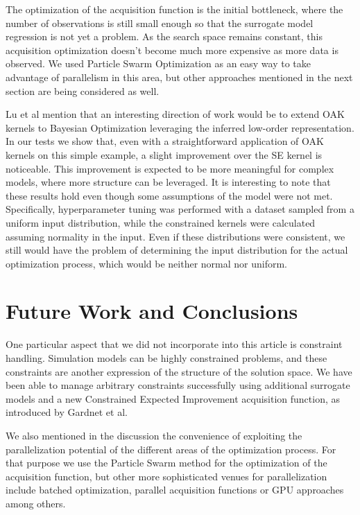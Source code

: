 \documentclass{IOS-Book-Article}
\begin{document}
	The optimization of the acquisition function is the initial bottleneck, where the number of observations is still small enough so that the surrogate model regression is not yet a problem. As the search space remains constant, this acquisition optimization doesn't become much more expensive as more data is observed. We used Particle Swarm Optimization as an easy way to take advantage of parallelism in this area, but other approaches mentioned in the next section are being considered as well\cite{acquisition-functions}.
	
	Lu et al\cite{gp-additive-orthogonal} mention that an interesting direction of work would be to extend OAK kernels to Bayesian Optimization leveraging the inferred low-order representation. In our tests we show that, even with a straightforward application of OAK kernels on this simple example, a slight improvement over the SE kernel is noticeable. This improvement is expected to be more meaningful for complex models, where more structure can be leveraged. It is interesting to note that these results hold even though some assumptions of the model were not met. Specifically, hyperparameter tuning was performed with a dataset sampled from a uniform input distribution, while the constrained kernels were calculated assuming normality in the input. Even if these distributions were consistent, we still would have the problem of determining the input distribution for the actual optimization process, which would be neither normal nor uniform.
	
	
	\section{Future Work and Conclusions}
	One particular aspect that we did not incorporate into this article is constraint handling. Simulation models can be highly constrained problems, and these constraints are another expression of the structure of the solution space. We have been able to manage arbitrary constraints successfully using additional surrogate models and a new Constrained Expected Improvement acquisition function, as introduced by Gardnet et al\cite{gp-constraints}.
	
	We also mentioned in the discussion the convenience of exploiting the parallelization potential of the different areas of the optimization process. For that purpose we use the Particle Swarm method for the optimization of the acquisition function, but other more sophisticated venues for parallelization include batched optimization\cite{gp-batch}\cite{gp-batch2}, parallel acquisition functions\cite{gp-parallel-acq-func} or GPU approaches\cite{gp-gpu} among others.
	
\end{document}
